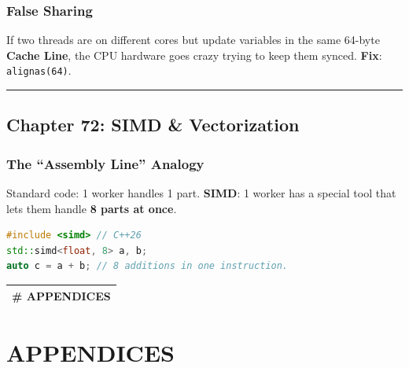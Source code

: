 \hypertarget{false-sharing}{%
\subsubsection{False Sharing}\label{false-sharing}}

If two threads are on different cores but update variables in the same
64-byte \textbf{Cache Line}, the CPU hardware goes crazy trying to keep
them synced. \textbf{Fix}: \passthrough{\lstinline!alignas(64)!}.

\begin{center}\rule{0.5\linewidth}{0.5pt}\end{center}

\hypertarget{chapter-72-simd-vectorization}{%
\subsection{Chapter 72: SIMD \&
Vectorization}\label{chapter-72-simd-vectorization}}

\hypertarget{the-assembly-line-analogy}{%
\subsubsection{The ``Assembly Line''
Analogy}\label{the-assembly-line-analogy}}

Standard code: 1 worker handles 1 part. \textbf{SIMD}: 1 worker has a
special tool that lets them handle \textbf{8 parts at once}.

\begin{lstlisting}[language={C++}]
#include <simd> // C++26
std::simd<float, 8> a, b;
auto c = a + b; // 8 additions in one instruction.
\end{lstlisting}

\begin{longtable}[]{@{}
  >{\raggedright\arraybackslash}p{}@{}}
\toprule
\endhead
\# APPENDICES \\
\bottomrule
\end{longtable}

\hypertarget{appendices}{%
\section{APPENDICES}\label{appendices}}
